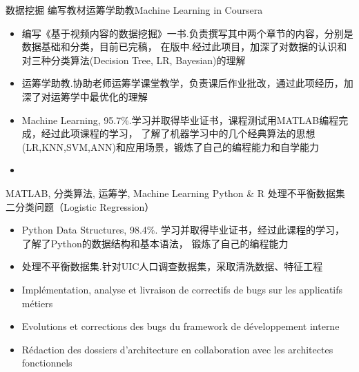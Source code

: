 %
%
%
\begin{experiences}
  \experience
    {数据挖掘}      {编写教材}{运筹学助教}{Machine Learning in Coursera}
    {}              {
                      \begin{itemize}
                        \item 编写《基于视频内容的数据挖掘》一书.负责撰写其中两个章节的内容，分别是数据基础和分类，目前已完稿，
							  在版中.经过此项目，加深了对数据的认识和对三种分类算法(Decision Tree, LR, Bayesian)的理解                        
                        \item 运筹学助教.协助老师运筹学课堂教学，负责课后作业批改，通过此项经历，加深了对运筹学中最优化的理解                    
                        \item Machine Learning, 95.7\%.学习并取得毕业证书，课程测试用MATLAB编程完成，经过此项课程的学习，
							  了解了机器学习中的几个经典算法的思想(LR,KNN,SVM,ANN)和应用场景，锻炼了自己的编程能力和自学能力                
                        \item                                                                    
                      \end{itemize}
                    }
                    {MATLAB, 分类算法, 运筹学, Machine Learning}
  \emptySeparator
  \experience
    {Python \& R}   {处理不平衡数据集}{二分类问题（Logistic Regression）}{}
    {}              {
                      \begin{itemize}
                        \item Python Data Structures, 98.4\%. 学习并取得毕业证书，经过此课程的学习，了解了Python的数据结构和基本语法，
							  锻炼了自己的编程能力
                        \item 处理不平衡数据集.针对UIC人口调查数据集，采取清洗数据、特征工程
                        \item Implémentation, analyse et livraison de correctifs de bugs sur les applicatifs métiers  
                        \item Evolutions et corrections des bugs du framework de développement interne                
                        \item Rédaction des dossiers d'architecture en collaboration avec les architectes fonctionnels

\end{itemize}}
\end{experiences}
